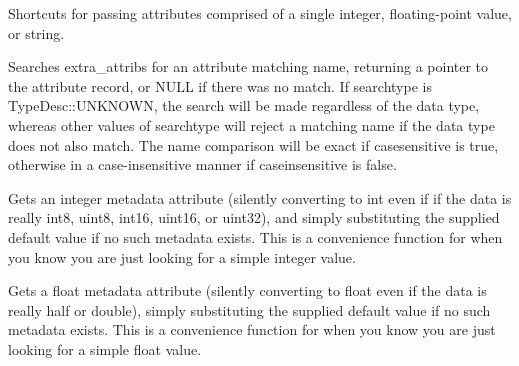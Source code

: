 Shortcuts for passing attributes comprised of a single integer,
floating-point value, or string.
\apiend


Searches {\cf extra_attribs} for an attribute matching {\cf name},
returning a pointer to the attribute record, or NULL if there was no
match.  If {\cf searchtype} is {\cf TypeDesc::UNKNOWN}, the search will be made
regardless of the data type, whereas other values of {\cf searchtype}
will reject a matching name if the data type does not also match.  The
name comparison will be exact if {\cf casesensitive} is true, otherwise
in a case-insensitive manner if {\cf caseinsensitive} is false.
\apiend

Gets an integer metadata attribute (silently converting to {\cf int}
even if if the data is really int8, uint8, int16, uint16, or uint32),
and simply substituting the supplied default value if no such metadata
exists.  This is a convenience function for when you know you are just
looking for a simple integer value.
\apiend

Gets a float metadata attribute (silently converting to {\cf float} even
if the data is really half or double), simply substituting the supplied
default value if no such metadata exists.  This is a convenience
function for when you know you are just looking for a simple float value.
\apiend

